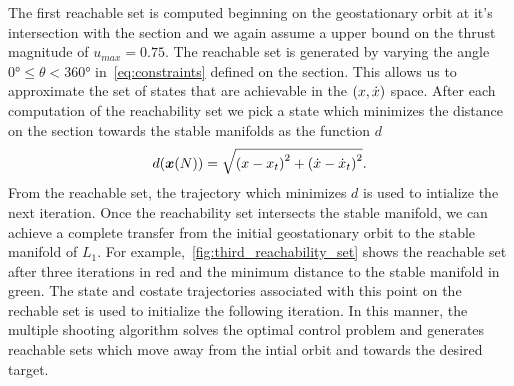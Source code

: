 \documentclass[smallcondensed]{svjour3}
\begin{document}
The first reachable set is computed beginning on the geostationary orbit at it's intersection with the \Poincare section and we again assume a upper bound on the thrust magnitude of \( u_{max} = 0.75 \).
The reachable set is generated by varying the angle \( \ang{0} \leq \theta < \ang{360} \) in~\cref{eq:constraints} defined on the \Poincare section.
This allows us to approximate the set of states that are achievable in the \( \left( x ,\dot{x} \right) \) space.
After each computation of the reachability set we pick a state which minimizes the distance on the \Poincare section towards the stable manifolds as the function \( d \)
\begin{align*}
        d(\bm{x}(N)) = \sqrt{\left( x - x_t \right)^2 + \left( \dot{x} - \dot{x}_t \right)^2}.
\end{align*}
From the reachable set, the trajectory which minimizes \( d \) is used to intialize the next iteration.
Once the reachability set intersects the stable manifold, we can achieve a complete transfer from the initial geostationary orbit to the stable manifold of \( L_1 \).
For example,~\cref{fig:third_reachability_set} shows the reachable set after three iterations in red and the minimum distance to the stable manifold in green.
The state and costate trajectories associated with this point on the rechable set is used to initialize the following iteration. 
In this manner, the multiple shooting algorithm solves the optimal control problem and generates reachable sets which move away from the intial orbit and towards the desired target.
\end{document}
